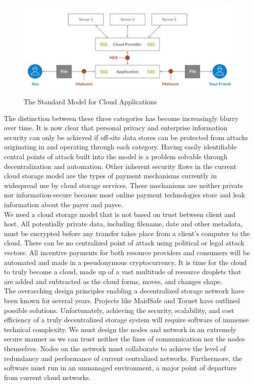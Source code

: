 \documentclass[a4paper,12pt]{article}
\begin{document}
\begin{figure}[h!]
  \centering
      \includegraphics[width=\linewidth]{01}
  \caption{The Standard Model for Cloud Applications}
\end{figure}

The distinction between these three categories has become increasingly blurry over time. It is now clear that personal privacy and enterprise information security can only be achieved if off-site data stores can be protected from attacks originating in and operating through each category.  Having easily identifiable central points of attack built into the model is a problem solvable through decentralization and automation. Other inherent security flaws in the current cloud storage model are the types of payment mechanisms currently in widespread use by cloud storage services. These mechanisms are neither private nor information-secure because most online payment technologies store and leak information about the payer and payee.\\

We need a cloud storage model that is not based on trust between client and host.  All potentially private data, including filename, date and other metadata, must be encrypted before any transfer takes place from a client’s computer to the cloud.  There can be no centralized point of attack using political or legal attack vectors.  All incentive payments for both resource providers and consumers will be automated and made in a pseudonymous cryptocurrency.  It is time for the cloud to truly become a cloud, made up of a vast multitude of resource droplets that are added and subtracted as the cloud forms, moves, and changes shape.\\

The overarching design principles enabling a decentralized storage network have been known for several years. Projects like MaidSafe \cite{1} and Tornet \cite{2} have outlined possible solutions. Unfortunately, achieving the security, scalability, and cost efficiency of a truly decentralized storage system will require software of immense technical complexity. We must design the nodes and network in an extremely secure manner as we can trust neither the lines of communication nor the nodes themselves. Nodes on the network must collaborate to achieve the level of redundancy and performance of current centralized networks. Furthermore, the software must run in an unmanaged environment, a major point of departure from current cloud networks.   \\
\end{document}
